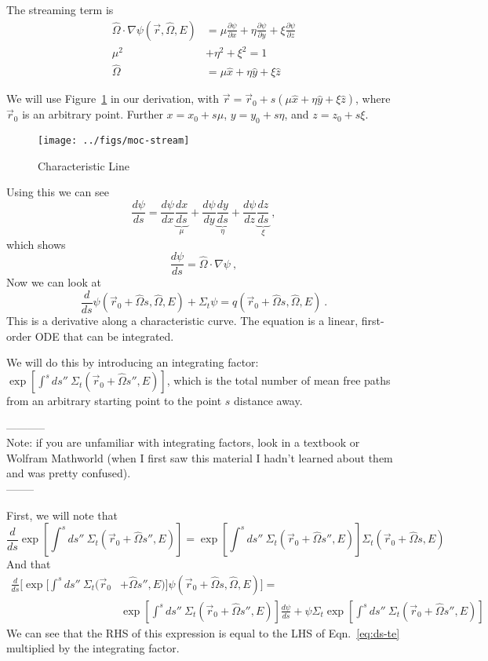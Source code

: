 \documentclass[12pt]{article}
\newcommand{\rvec}{\ensuremath{\vec{r}}}
\newcommand{\vOmega}{\ensuremath{\hat{\Omega}}}
\begin{document}
The streaming term is 
\begin{align*}
\vOmega \cdot \nabla \psi(\rvec, \vOmega, E) &= \mu \frac{\partial \psi}{\partial x} + \eta \frac{\partial \psi}{\partial y} + \xi \frac{\partial \psi}{\partial z} \\
\mu^2 &+ \eta^2 + \xi^2 = 1 \\
\vOmega &= \mu \hat{x} + \eta \hat{y} + \xi \hat{z}
\end{align*}
%

We will use Figure~\ref{fig:stream} in our derivation, with $\vec{r} = \rvec_0 + s(\mu \hat{x} + \eta \hat{y} + \xi \hat{z})$, where $\rvec_0$ is an arbitrary point.
Further $x = x_0 + s\mu$, $y = y_0 + s\eta$, and $z = z_0 + s\xi$.
%
\begin{figure}[h!] 
    \begin{center}
    \texttt{[image: ../figs/moc-stream]}    
    \end{center}   
    \caption{Characteristic Line}
    \label{fig:stream}
\end{figure}

Using this we can see
\[\frac{d\psi}{ds} = \frac{d\psi}{dx}\underbrace{\frac{dx}{ds}}_{\mu} + \frac{d\psi}{dy}\underbrace{\frac{dy}{ds}}_{\eta} + \frac{d\psi}{dz}\underbrace{\frac{dz}{ds}}_{\xi}\:,\]
which shows 
\[\frac{d\psi}{ds} = \vOmega \cdot \nabla \psi\:,\]
Now we can look at
\begin{equation}
\frac{d}{ds}\psi(\rvec_0 + \vOmega s, \vOmega, E) + \Sigma_t \psi = q(\rvec_0 + \vOmega s, \vOmega, E)\:.
\label{eq:ds-te}
\end{equation}
This is a derivative along a characteristic curve. 
The equation is a linear, first-order ODE that can be integrated. 


We will do this by introducing an integrating factor: $\exp[\int^s ds'' \: \Sigma_t(\rvec_0 + \vOmega s'', E)]$, which is the total number of mean free paths from an arbitrary starting point to the point $s$ distance away.

-----------\\
Note: if you are unfamiliar with integrating factors, look in a textbook or Wolfram Mathworld (when I first saw this material I hadn't learned about them and was pretty confused). \\
--------

First, we will note that
\[\frac{d}{ds}\exp[\int^s ds'' \: \Sigma_t(\rvec_0 + \vOmega s'', E)] = \exp[\int^s ds'' \: \Sigma_t(\rvec_0 + \vOmega s'', E)] \Sigma_t(\rvec_0 + \vOmega s, E)\]
And that
\begin{align*}
\frac{d}{ds}\biggl[\exp[\int^s ds'' \: \Sigma_t(\rvec_0 &+ \vOmega s'', E)]\psi(\rvec_0 + \vOmega s, \vOmega, E)\biggr] =\\ &\exp[\int^s ds'' \: \Sigma_t(\rvec_0 + \vOmega s'', E)]\frac{d \psi}{ds} + \psi \Sigma_t \exp[\int^s ds'' \: \Sigma_t(\rvec_0 + \vOmega s'', E)]
\end{align*}
We can see that the RHS of this expression is equal to the LHS of Eqn.~\ref{eq:ds-te} multiplied by the integrating factor.
\end{document}
